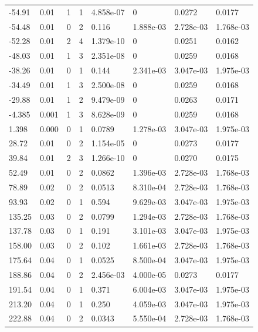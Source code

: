\documentclass[preview]{standalone}
\begin{document}
{{\begin{tabular}{L{1.2cm}C{1.2cm} C{0.3cm}C{0.5cm} C{1.4cm}C{1.4cm} C{1.4cm}C{1.4cm}}
  -54.91  &  0.01  & 1     &  1 &  4.858e-07  & 0  & 0.0272 &  0.0177   \\ 
  -54.48  &  0.01  & 0     &  2 &  0.116  & 1.888e-03  & 2.728e-03 &  1.768e-03   \\ 
  -52.28  &  0.01  & 2     &  4 &  1.379e-10  & 0  & 0.0251 &  0.0162   \\ 
  -48.03  &  0.01  & 1     &  3 &  2.351e-08  & 0  & 0.0259 &  0.0168   \\ 
  -38.26  &  0.01  & 0     &  1 &  0.144  & 2.341e-03  & 3.047e-03 &  1.975e-03   \\ 
  -34.49  &  0.01  & 1     &  3 &  2.500e-08  & 0  & 0.0259 &  0.0168   \\ 
  -29.88  &  0.01  & 1     &  2 &  9.479e-09  & 0  & 0.0263 &  0.0171   \\ 
  -4.385  &  0.001  & 1     &  3 &  8.628e-09  & 0  & 0.0259 &  0.0168   \\ 
  1.398  &  0.000  & 0     &  1 &  0.0789  & 1.278e-03  & 3.047e-03 &  1.975e-03   \\ 
  28.72  &  0.01  & 0     &  2 &  1.154e-05  & 0  & 0.0273 &  0.0177   \\ 
  39.84  &  0.01  & 2     &  3 &  1.266e-10  & 0  & 0.0270 &  0.0175   \\ 
  52.49  &  0.01  & 0     &  2 &  0.0862  & 1.396e-03  & 2.728e-03 &  1.768e-03   \\ 
  78.89  &  0.02  & 0     &  2 &  0.0513  & 8.310e-04  & 2.728e-03 &  1.768e-03   \\ 
  93.93  &  0.02  & 0     &  1 &  0.594  & 9.629e-03  & 3.047e-03 &  1.975e-03   \\ 
  135.25  &  0.03  & 0     &  2 &  0.0799  & 1.294e-03  & 2.728e-03 &  1.768e-03   \\ 
  137.78  &  0.03  & 0     &  1 &  0.191  & 3.101e-03  & 3.047e-03 &  1.975e-03   \\ 
  158.00  &  0.03  & 0     &  2 &  0.102  & 1.661e-03  & 2.728e-03 &  1.768e-03   \\ 
  175.64  &  0.04  & 0     &  1 &  0.0525  & 8.500e-04  & 3.047e-03 &  1.975e-03   \\ 
  188.86  &  0.04  & 0     &  2 &  2.456e-03  & 4.000e-05  & 0.0273 &  0.0177   \\ 
  191.54  &  0.04  & 0     &  1 &  0.371  & 6.004e-03  & 3.047e-03 &  1.975e-03   \\ 
  213.20  &  0.04  & 0     &  1 &  0.250  & 4.059e-03  & 3.047e-03 &  1.975e-03   \\ 
  222.88  &  0.04  & 0     &  2 &  0.0343  & 5.550e-04  & 2.728e-03 &  1.768e-03   \\ 

\end{tabular}}}
\end{document}

